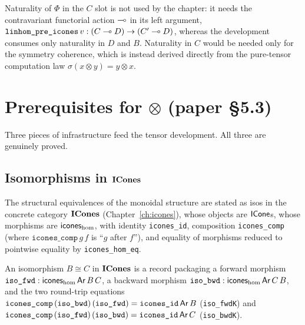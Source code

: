 \begin{remark}
Naturality of $\Phi$ in the $C$ slot is not used by the chapter: it
needs the contravariant functorial action $\multimap$ in its left argument,
$\texttt{linhom\_pre\_icones}\,v : (C \multimap D) \to (C' \multimap D)$, whereas
the development consumes only naturality in $D$ and $B$. Naturality in
$C$ would be needed only for the symmetry coherence, which is instead
derived directly from the pure-tensor computation law $\sigma(x \otimes
y) = y \otimes x$.
\end{remark}

\section{Prerequisites for \texorpdfstring{$\otimes$}{(x)} (paper \S5.3)}%
\label{sec:tensor-prereq}

Three pieces of infrastructure feed the tensor development. All three
are genuinely proved.

\subsection{Isomorphisms in \texorpdfstring{$\mathbf{ICones}$}{ICones}}\label{sec:icones-iso}

The structural equivalences of the monoidal structure are stated as
isos in the concrete category $\mathbf{ICones}$ (Chapter~\ref{ch:icones}),
whose objects are $\mathsf{ICone}$s, whose morphisms are
$\mathsf{icones}_{\mathrm{hom}}$, with identity \texttt{icones\_id},
composition \texttt{icones\_comp} (where $\texttt{icones\_comp}\,g\,f$
is ``$g$ after $f$''), and equality of morphisms reduced to pointwise
equality by \texttt{icones\_hom\_eq}.

\begin{definition}\label{def:icones-iso}
\rocqok{}
An isomorphism $B \cong C$ in $\mathbf{ICones}$ is a record
 packaging a forward
morphism $\texttt{iso\_fwd} : \mathsf{icones}_{\mathrm{hom}}\,\mathsf{Ar}\,B\,C$, a
backward morphism $\texttt{iso\_bwd} : \mathsf{icones}_{\mathrm{hom}}\,\mathsf{Ar}\,C\,B$,
and the two round-trip equations
$\texttt{icones\_comp}\,(\texttt{iso\_bwd})\,(\texttt{iso\_fwd}) =
\texttt{icones\_id}\,\mathsf{Ar}\,B$ (\texttt{iso\_fwdK}) and
$\texttt{icones\_comp}\,(\texttt{iso\_fwd})\,(\texttt{iso\_bwd}) =
\texttt{icones\_id}\,\mathsf{Ar}\,C$ (\texttt{iso\_bwdK}).
\end{definition}

